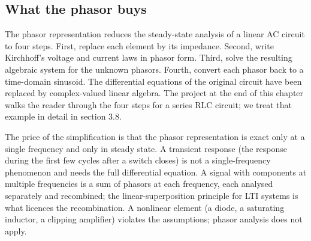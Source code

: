 \subsection{What the phasor buys}

The phasor representation reduces the steady-state analysis of a
linear AC circuit to four steps. First, replace each element by
its impedance. Second, write Kirchhoff's voltage and current laws
in phasor form. Third, solve the resulting algebraic system for
the unknown phasors. Fourth, convert each phasor back to a
time-domain sinusoid. The differential equations of the original
circuit have been replaced by complex-valued linear algebra. The
project at the end of this chapter walks the reader through the
four steps for a series RLC circuit; we treat that example in
detail in section 3.8.

The price of the simplification is that the phasor representation
is exact only at a single frequency and only in steady state. A
transient response (the response during the first few cycles
after a switch closes) is not a single-frequency phenomenon and
needs the full differential equation. A signal with components at
multiple frequencies is a sum of phasors at each frequency, each
analysed separately and recombined; the linear-superposition
principle for LTI systems is what licences the recombination. A
nonlinear element (a diode, a saturating inductor, a clipping
amplifier) violates the assumptions; phasor analysis does not
apply.


